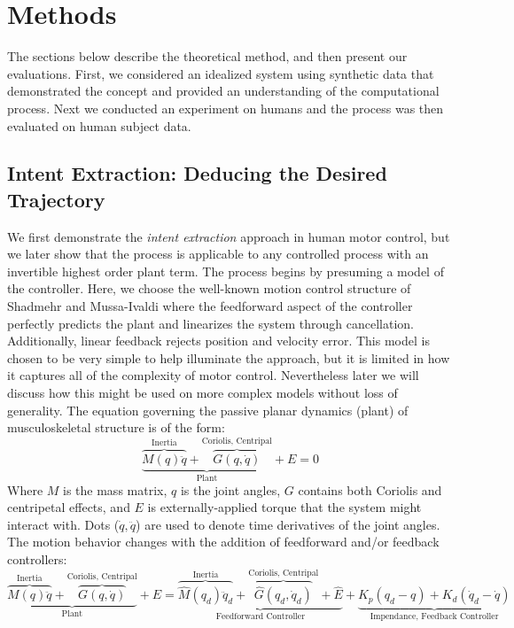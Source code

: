 \documentclass[10pt]{article}
\begin{document}
\section*{Methods}
The sections below describe the theoretical method, and then present our evaluations. First, we considered an idealized system using synthetic data that demonstrated the concept and provided an understanding of the computational process. Next we conducted an experiment on humans and the process was then evaluated on human subject data. 

\subsection*{Intent Extraction: Deducing the Desired Trajectory}
We first demonstrate the \textit{intent extraction} approach in human motor control, but we later show that the process is applicable to any controlled process with an invertible highest order plant term. The process begins by presuming a model of the controller. Here, we choose the well-known motion control structure of Shadmehr and Mussa-Ivaldi\cite{shadmehr1994adaptive} where the feedforward aspect of the controller perfectly predicts the plant and linearizes the system through cancellation. Additionally, linear feedback rejects position and velocity error. This model is chosen to be very simple to help illuminate the approach, but it is limited in how it captures all of the complexity of motor control. Nevertheless later we will discuss how this might be used on more complex models without loss of generality. The equation governing the passive planar dynamics (plant) of musculoskeletal structure is of the form:
\begin{equation}
\underbrace{\overbrace{M(q)\ddot{q}}^{\text{Inertia}}+\overbrace{G(q,\dot{q})}^{\text{Coriolis, Centripal}}}_{\text{Plant}}+E=0
\end{equation}
Where $M$ is the mass matrix, $q$ is the joint angles, $G$ contains both Coriolis and centripetal effects, and $E$ is externally-applied torque that the system might interact with. Dots ($\dot{q}, \ddot{q}$) are used to denote time derivatives of the joint angles. The motion behavior changes with the addition of feedforward and/or feedback controllers:
\begin{equation}
\underbrace{\overbrace{M(q)\ddot{q}}^{\text{Inertia}}+\overbrace{G(q,\dot{q})}^{\text{Coriolis, Centripal}}}_{\text{Plant}}+E=\underbrace{\overbrace{\hat{M}(q_d)\ddot{q}_d}^{\text{Inertia}}+\overbrace{\hat{G}(q_d,\dot{q}_d)}^{\text{Coriolis, Centripal}}+\hat{E}}_{\text{Feedforward Controller}}+\underbrace{K_p(q_d-q)+K_d(\dot{q}_d-\dot{q})}_{\text{Impendance, Feedback Controller}}
\end{equation}
\end{document}
